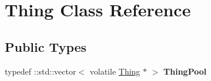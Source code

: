 \hypertarget{classThing}{}\section{Thing Class Reference}
\label{classThing}
\subsection*{Public Types}
\begin{DoxyCompactItemize}
\item 
\hypertarget{classThing_a5e8524a8213826e36c0cf69fcc964dec}{}typedef \+::std\+::vector$<$ volatile \hyperlink{classThing}{Thing} $\ast$ $>$ {\bfseries Thing\+Pool}\label{classThing_a5e8524a8213826e36c0cf69fcc964dec}

\end{DoxyCompactItemize}
